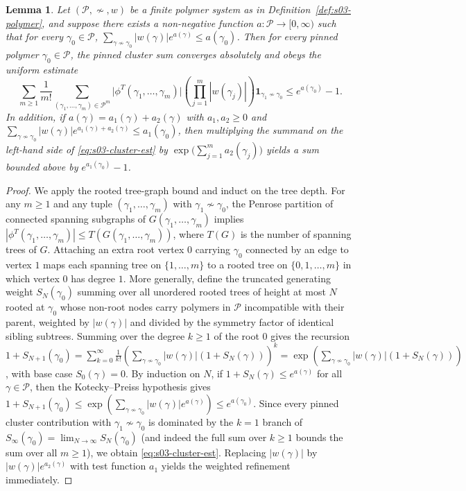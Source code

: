 \documentclass[11pt]{article}
\newtheorem{lemma}[theorem]{Lemma}
\theoremstyle{definition}
\begin{document}
\begin{lemma}
\label{lem:s03-cluster}
Let $(\mathcal{P}, \not\sim, w)$ be a finite polymer system as in
Definition~\ref{def:s03-polymer}, and suppose there exists a non-negative function
$a : \mathcal{P} \to [0, \infty)$ such that for every $\gamma_0 \in \mathcal{P}$,
$\sum_{\gamma \not\sim \gamma_0} |w(\gamma)| e^{a(\gamma)} \le a(\gamma_0)$. Then
for every pinned polymer $\gamma_0 \in \mathcal{P}$, the pinned cluster sum
converges absolutely and obeys the uniform estimate
\begin{equation}
\label{eq:s03-cluster-est}
  \sum_{m \ge 1} \frac{1}{m!} \sum_{(\gamma_1, \dots, \gamma_m) \in \mathcal{P}^m} \bigl|\phi^T(\gamma_1, \dots, \gamma_m)\bigr| \left(\prod_{j=1}^m |w(\gamma_j)|\right) \mathbf{1}_{\gamma_1 \not\sim \gamma_0} \le e^{a(\gamma_0)} - 1.
\end{equation}
In addition, if $a(\gamma) = a_1(\gamma) + a_2(\gamma)$ with $a_1, a_2 \ge 0$ and
$\sum_{\gamma \not\sim \gamma_0} |w(\gamma)| e^{a_1(\gamma) + a_2(\gamma)} \le
a_1(\gamma_0)$, then multiplying the summand on the left-hand side of
\eqref{eq:s03-cluster-est} by $\exp\!\bigl(\sum_{j=1}^m a_2(\gamma_j)\bigr)$ yields
a sum bounded above by $e^{a_1(\gamma_0)} - 1$.
\end{lemma}
\begin{proof}
We apply the rooted tree-graph bound and induct on the tree depth. For any $m \ge 1$
and any tuple $(\gamma_1, \dots, \gamma_m)$ with $\gamma_1 \not\sim \gamma_0$, the
Penrose partition of connected spanning subgraphs of $G(\gamma_1, \dots, \gamma_m)$
implies $|\phi^T(\gamma_1, \dots, \gamma_m)| \le T(G(\gamma_1, \dots, \gamma_m))$,
where $T(G)$ is the number of spanning trees of $G$. Attaching an extra root vertex
$0$ carrying $\gamma_0$ connected by an edge to vertex $1$ maps each spanning tree
on $\{1, \dots, m\}$ to a rooted tree on $\{0, 1, \dots, m\}$ in which vertex $0$
has degree $1$. More generally, define the truncated generating weight
$S_N(\gamma_0)$ summing over all unordered rooted trees of height at most $N$ rooted
at $\gamma_0$ whose non-root nodes carry polymers in $\mathcal{P}$ incompatible with
their parent, weighted by $|w(\gamma)|$ and divided by the symmetry factor of
identical sibling subtrees. Summing over the degree $k \ge 1$ of the root $0$ gives
the recursion $1 + S_{N+1}(\gamma_0) = \sum_{k=0}^\infty \frac{1}{k!}
\left(\sum_{\gamma \not\sim \gamma_0} |w(\gamma)| (1 + S_N(\gamma))\right)^k =
\exp\!\left(\sum_{\gamma \not\sim \gamma_0} |w(\gamma)| (1 + S_N(\gamma))\right)$,
with base case $S_0(\gamma) = 0$. By induction on $N$, if $1 + S_N(\gamma) \le
e^{a(\gamma)}$ for all $\gamma \in \mathcal{P}$, then the Kotecky--Preiss hypothesis
gives $1 + S_{N+1}(\gamma_0) \le \exp\!\left(\sum_{\gamma \not\sim \gamma_0}
|w(\gamma)| e^{a(\gamma)}\right) \le e^{a(\gamma_0)}$. Since every pinned cluster
contribution with $\gamma_1 \not\sim \gamma_0$ is dominated by the $k = 1$ branch of
$S_\infty(\gamma_0) = \lim_{N \to \infty} S_N(\gamma_0)$ (and indeed the full sum
over $k \ge 1$ bounds the sum over all $m \ge 1$), we obtain
\eqref{eq:s03-cluster-est}. Replacing $|w(\gamma)|$ by $|w(\gamma)| e^{a_2(\gamma)}$
with test function $a_1$ yields the weighted refinement immediately.
\end{proof}
\end{document}
